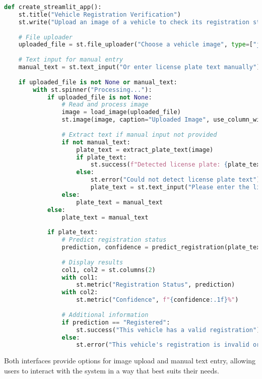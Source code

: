 \documentclass[conference]{IEEEtran}
\begin{document}
\begin{lstlisting}[language=Python, caption=Streamlit Interface Implementation]
def create_streamlit_app():
    st.title("Vehicle Registration Verification")
    st.write("Upload an image of a vehicle to check its registration status")
    
    # File uploader
    uploaded_file = st.file_uploader("Choose a vehicle image", type=["jpg", "jpeg", "png"])
    
    # Text input for manual entry
    manual_text = st.text_input("Or enter license plate text manually")
    
    if uploaded_file is not None or manual_text:
        with st.spinner("Processing..."):
            if uploaded_file is not None:
                # Read and process image
                image = load_image(uploaded_file)
                st.image(image, caption="Uploaded Image", use_column_width=True)
                
                # Extract text if manual input not provided
                if not manual_text:
                    plate_text = extract_plate_text(image)
                    if plate_text:
                        st.success(f"Detected license plate: {plate_text}")
                    else:
                        st.error("Could not detect license plate text")
                        plate_text = st.text_input("Please enter the license plate manually")
                else:
                    plate_text = manual_text
            else:
                plate_text = manual_text
            
            if plate_text:
                # Predict registration status
                prediction, confidence = predict_registration(plate_text)
                
                # Display results
                col1, col2 = st.columns(2)
                with col1:
                    st.metric("Registration Status", prediction)
                with col2:
                    st.metric("Confidence", f"{confidence:.1f}%")
                
                # Additional information
                if prediction == "Registered":
                    st.success("This vehicle has a valid registration")
                else:
                    st.error("This vehicle's registration is invalid or expired")
\end{lstlisting}

Both interfaces provide options for image upload and manual text entry, allowing users to interact with the system in a way that best suits their needs.
\end{document}

